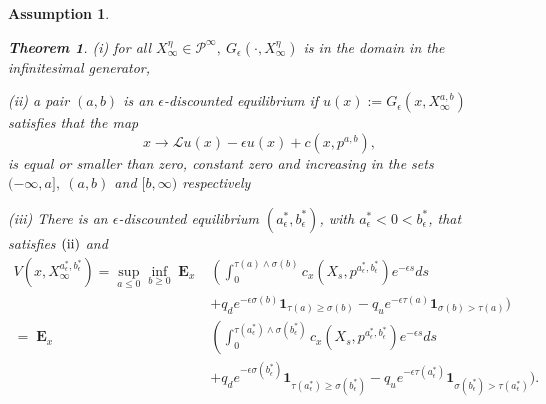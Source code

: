 \documentclass{article}
\newtheorem{theorem}[thm]{Theorem}
\newtheorem{assumptions}[thm]{Assumption}
\newcommand\E{\operatorname{\mathbf{E}}}
\begin{document}
\begin{assumptions}
\begin{theorem}
\vskip1mm\par\noindent
{\rm(i)} 
 for all $X^{\eta}_{\infty} \in \mathcal{P}^{\infty}, \  G_{\epsilon}(\cdot,X^{\eta}_{\infty})$ is in the domain in the infinitesimal generator,
 

\vskip1mm\par\noindent
{\rm(ii)}  a pair $(a,b)$ is an $\epsilon$-discounted equilibrium if $u(x):=G_{\epsilon}(x,X^{a,b}_{\infty})$  satisfies that the map
$$ x  \rightarrow \mathcal{L}u(x)- \epsilon u(x)+c(x,p^{a,b}), $$
is equal or smaller than zero, constant zero and increasing in the sets $(-\infty, a] , \ (a,b) $ and $[b,\infty)$ respectively


\vskip1mm\par\noindent
{\rm(iii)} 
There is an $\epsilon$-discounted equilibrium  
 $(a^{\ast}_{\epsilon}, b^{\ast}_{\epsilon})$, with $a^*_{\epsilon} < 0 < b^*_{\epsilon} $, that satisfies $\rm{(ii)}$ and
\begin{align*}
    V(x,X^{a^*_{\epsilon},b^*_{\epsilon}}_{\infty})  = 
     \sup_{a \leq 0} \inf_{b \geq 0}\E_x & \left(\int_0^{\tau(a) \wedge \sigma(b)} c_x(X_s,p^{a^{\ast}_{\epsilon},b^{\ast}_{\epsilon}})e^{-\epsilon s}ds \right. \\ 
     &  +q_d e^{-\epsilon \sigma(b)} \mathbf{1}_{\tau(a) \geq \sigma(b) }  
     -q_ue^{-\epsilon \tau(a)} \mathbf{1}_{\sigma(b) >\tau(a)}  \Bigg)  \\
     =\E_x &   \left(\int_0^{\tau(a^{\ast}_{\epsilon}) \wedge \sigma(b^{\ast}_{\epsilon})}  c_x(X_s,p^{a^{\ast}_{\epsilon},b^{\ast}_{\epsilon}})  e^{-\epsilon s}ds \right.  \\
     &  +q_d e^{-\epsilon \sigma(b^{\ast}_{\epsilon})} \mathbf{1}_{\tau(a^{\ast}_{\epsilon}) \geq \sigma(b^{\ast}_{\epsilon}) }  
     -q_ue^{-\epsilon \tau(a^{\ast}_{\epsilon})} \mathbf{1}_{\sigma(b^{\ast}_{\epsilon}) >\tau(a^{\ast}_{\epsilon})}   \Bigg) .
    \end{align*}


\end{theorem}
\end{assumptions}
\end{document}
